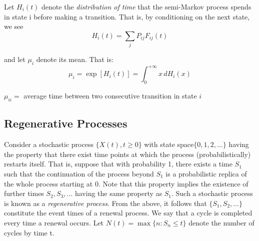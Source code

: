 Let $H_i(t)$ denote the \emph{distribution of time} that the semi-Markov process spends
in state i before making a transition. That is, by conditioning on the next
state, we see
	\begin{equation}
		H_i(t) = \sum_j P_{ij} F_{ij}(t)
	\end{equation}

and let $\mu_i$ denote its mean. That is:
	\begin{equation}
		 \mu_i = \exp[H_i(t)] = \int_{0}^{+\infty}x \,dH_i(x)
	\end{equation}

\begin{definition}
	$\mu_{ii} = $ average time between two consecutive transition in state $i$
\end{definition}

\subsection{Regenerative Processes}

Consider a stochastic process $\{X(t), t \geq 0\}$ with state space$\{0, 1, 2, ... \}$ having
the property that there exist time points at which the process (probabilistically) restarts itself. That is, suppose that with probability 1, there exists a time $S_1$
such that the continuation of the process beyond $S_1$ is a probabilistic replica
of the whole process starting at 0. Note that this property implies the existence
of further times $S_2 , S_3 , \dots$ having the same property as $S_1$. Such a stochastic
process is known as a \emph{regenerative process}.
From the above, it follows that $\{S_1 , S_2 , ...\}$ constitute the event times of
a renewal process. We say that a cycle is completed every time a renewal
occurs. Let $N(t) = \max\{n: S_n \leq t\}$ denote the number of cycles by time t.

